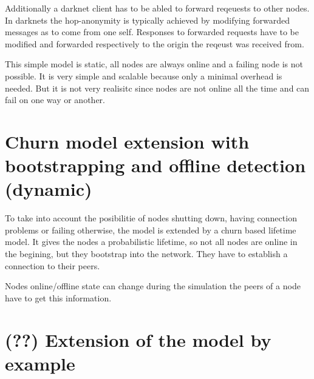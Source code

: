 Additionally a darknet client has to be abled to forward reqeuests to other nodes. In darknets the hop-anonymity is typically achieved by modifying forwarded messages as to come from one self. Responses to forwarded requests have to be modified and forwarded respectively to the origin the reqeust was received from.

This simple model is static, all nodes are always online and a failing node is not possible. It is very simple and scalable because only a minimal overhead is needed. But it is not very realisitc since nodes are not online all the time and can fail on one way or another.


\section{Churn model extension with bootstrapping and offline detection (dynamic)}

To take into account the posibilitie of nodes shutting down, having connection problems or failing otherwise, the model is extended by a churn based lifetime model. It gives the nodes a probabilistic lifetime, so not all nodes are online in the begining, but they bootstrap into the network. They have to establish a connection to their peers.

Nodes online/offline state can change during the simulation the peers of a node have to get this information. 



\section{(??) Extension of the model by example}
